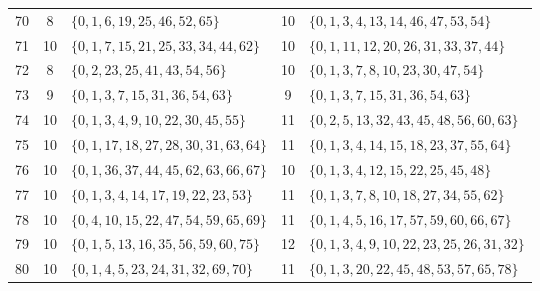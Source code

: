 \documentclass[11pt]{article}
\begin{document}
\begin{center}
\begin{longtable}{c c >{\raggedright\arraybackslash}p{} c >{\raggedright\arraybackslash}p{}}
			70 & 8 & \(\{0,1,6,19,25,46,52,65\}\) & 10 & \(\{0,1,3,4,13,14,46,47,53,54\}\) \\
			71 & 10 & \(\{0,1,7,15,21,25,33,34,44,62\}\) & 10 & \(\{0,1,11,12,20,26,31,33,37,44\}\) \\
			72 & 8 & \(\{0,2,23,25,41,43,54,56\}\) & 10 & \(\{0,1,3,7,8,10,23,30,47,54\}\) \\
			73 & 9 & \(\{0,1,3,7,15,31,36,54,63\}\) & 9 & \(\{0,1,3,7,15,31,36,54,63\}\) \\
			74 & 10 & \(\{0,1,3,4,9,10,22,30,45,55\}\) & 11 & \(\{0,2,5,13,32,43,45,48,56,60,63\}\) \\
			75 & 10 & \(\{0,1,17,18,27,28,30,31,63,64\}\)
			& 11 & \(\{0,1,3,4,14,15,18,23,37,55,64\}\) \\
			76 & 10 & \(\{0,1,36,37,44,45,62,63,66,67\}\)
			& 10 & \(\{0,1,3,4,12,15,22,25,45,48\}\) \\
			77 & 10 & \(\{0,1,3,4,14,17,19,22,23,53\}\)
			& 11 & \(\{0,1,3,7,8,10,18,27,34,55,62\}\) \\
			78 & 10 & \(\{0,4,10,15,22,47,54,59,65,69\}\)
			& 11 & \(\{0,1,4,5,16,17,57,59,60,66,67\}\) \\
			79 & 10 & \(\{0,1,5,13,16,35,56,59,60,75\}\)
			& 12 & \(\{0,1,3,4,9,10,22,23,25,26,31,32\}\) \\
			80 & 10 & \(\{0, 1, 4, 5, 23, 24, 31, 32, 69, 70\}\)
			& 11 & \(\{0,1,3,20,22,45,48,53,57,65,78\}\) \\
			\bottomrule
		\end{longtable}
	\end{center}
	
\end{document}
